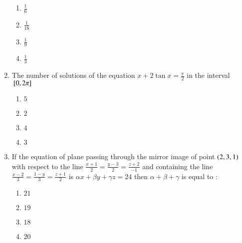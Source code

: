 \documentclass[journal,12pt,onecolumn]{IEEEtran}
\theoremstyle{remark}
\begin{document}
\begin{enumerate}
    \begin{multicols}{2}
        \begin{enumerate}
            \item $\frac{1}{6}$\\
            \item $\frac{1}{18}$
            \item $\frac{1}{9}$\\
            \item $\frac{1}{3}$
        \end{enumerate}
    \end{multicols}

    \item The number of solutions of the equation $x + 2\tan{x} = \frac{\pi}{2}$ in the interval ${}\left[0 , 2\pi\right]$
    \begin{multicols}{2}
        \begin{enumerate}
            \item $5$
            \item $2$\\
            \item $4$
            \item $3$
        \end{enumerate}
    \end{multicols}

    \item If the equation of plane passing through the mirror image of point $\left(2 , 3  , 1\right)$ with respect to the line $ \frac{x+1}{2} = \frac{y-3}{2} = \frac{z+2}{-1}$ and containing the line $\frac{x-2}{3} = \frac{1-y}{3} = \frac{z+1}{2}$ is $\alpha{x}+\beta{y}+\gamma{z} = 24$ then $\alpha + \beta + \gamma$ is equal to : 
    \begin{multicols}{2}
        \begin{enumerate}
            \item $21$
            \item $19$\\
            \item $18$
            \item $20$
        \end{enumerate}
    \end{multicols}


\end{enumerate}
\end{document}

